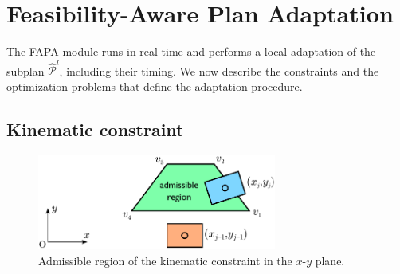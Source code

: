 \section{Feasibility-Aware Plan Adaptation}
\label{sec:FAPA:FeasibilityAwarePlanAdaptation}
The FAPA module runs in real-time and performs a local adaptation of the subplan $\mathcal{\hat P}^l$, including their timing. We now describe the constraints and the optimization problems that define the adaptation procedure.

\subsection{Kinematic constraint}

\begin{figure}
    \centering
    \includegraphics[width=0.7\textwidth]{figures/humanoids_kinconstr.pdf}
    \caption{Admissible region of the kinematic constraint in the $x$-$y$ plane.}
    \label{fig:FAPA:kinematic-constraint}
\end{figure}

